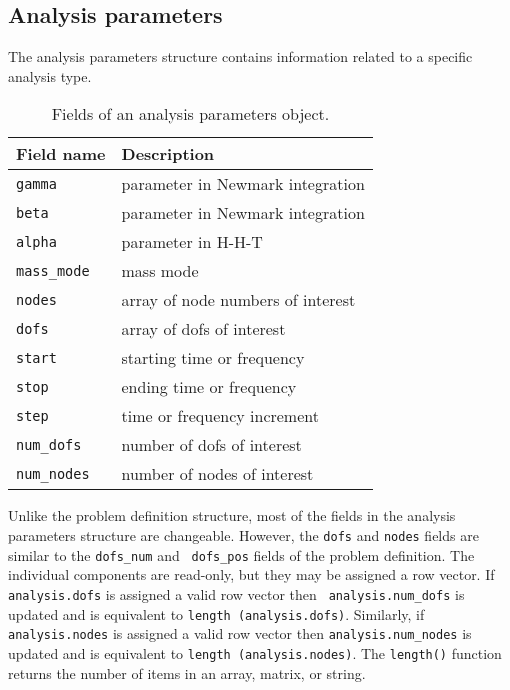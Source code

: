 \subsection{Analysis parameters}

The analysis parameters structure contains information related to
a specific analysis type.

{\scriptsize
\begin{table}[htbp]
\begin{center}
\begin{tabular}{l|l}
Field name	& Description				\\
\hline
\tt gamma	& parameter in Newmark integration	\\
\tt beta	& parameter in Newmark integration	\\
\tt alpha	& parameter in H-H-T			\\
\tt mass\_mode	& mass mode				\\
\tt nodes	& array of node numbers of interest	\\
\tt dofs	& array of dofs of interest		\\
\tt start	& starting time or frequency		\\
\tt stop	& ending time or frequency		\\
\tt step	& time or frequency increment		\\
\tt num\_dofs	& number of dofs of interest		\\
\tt num\_nodes	& number of nodes of interest		\\
\end{tabular}
\caption{Fields of an analysis parameters object.}
\label{burlap.analysis.fields}
\end{center}
\end{table}}

Unlike the problem definition structure, most of the fields in the
analysis parameters structure are changeable.  However, the {\tt dofs}
and {\tt nodes} fields are similar to the {\tt dofs\_num} and {\tt
dofs\_pos} fields of the problem definition.  The individual
components are read-only, but they may be assigned a row vector.  If
{\tt analysis.dofs} is assigned a valid row vector then {\tt
analysis.num\_dofs} is updated and is equivalent to {\tt length
(analysis.dofs)}.  Similarly, if {\tt analysis.nodes} is assigned a
valid row vector then {\tt analysis.num\_nodes} is updated and is
equivalent to {\tt length (analysis.nodes)}.  The {\tt length()}
function returns the number of items in an array, matrix, or string.



